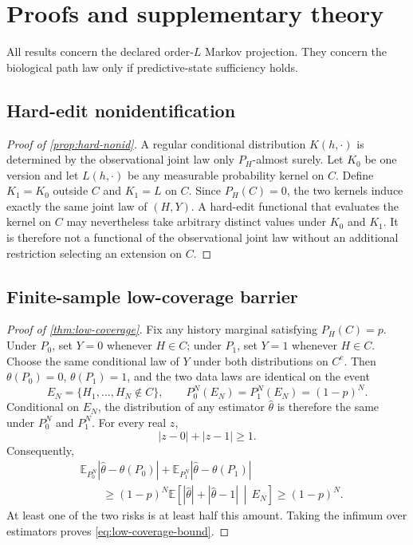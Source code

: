 \documentclass{article}
\newcommand{\E}{\mathbb E}
\theoremstyle{remark}
\begin{document}
\appendix

\section{Proofs and supplementary theory}
\label{app:proofs}

All results concern the declared order-\(L\) Markov projection. They concern
the biological path law only if predictive-state sufficiency holds.

\subsection{Hard-edit nonidentification}

\begin{proof}[Proof of \cref{prop:hard-nonid}]
A regular conditional distribution \(K(h,\cdot)\) is determined by the
observational joint law only \(P_H\)-almost surely. Let \(K_0\) be one version
and let \(L(h,\cdot)\) be any measurable probability kernel on \(C\). Define
\(K_1=K_0\) outside \(C\) and \(K_1=L\) on \(C\). Since \(P_H(C)=0\), the two
kernels induce exactly the same joint law of \((H,Y)\). A hard-edit functional
that evaluates the kernel on \(C\) may nevertheless take arbitrary distinct
values under \(K_0\) and \(K_1\). It is therefore not a functional of the
observational joint law without an additional restriction selecting an
extension on \(C\).
\end{proof}

\subsection{Finite-sample low-coverage barrier}

\begin{proof}[Proof of \cref{thm:low-coverage}]
Fix any history marginal satisfying \(P_H(C)=p\). Under \(P_0\), set
\(Y=0\) whenever \(H\in C\); under \(P_1\), set \(Y=1\) whenever \(H\in C\).
Choose the same conditional law of \(Y\) under both distributions on
\(C^c\). Then \(\theta(P_0)=0\), \(\theta(P_1)=1\), and the two data laws are
identical on the event
\[
  E_N=\{H_1,\ldots,H_N\notin C\},
  \qquad
  P_0^N(E_N)=P_1^N(E_N)=(1-p)^N.
\]
Conditional on \(E_N\), the distribution of any estimator
\(\widehat\theta\) is therefore the same under \(P_0^N\) and \(P_1^N\).
For every real \(z\),
\[
  |z-0|+|z-1|\geq1.
\]
Consequently,
\[
\begin{split}
  &\E_{P_0^N}|\widehat\theta-\theta(P_0)|
  +\E_{P_1^N}|\widehat\theta-\theta(P_1)|\\
  &\qquad\geq
  (1-p)^N
  \E\!\left[
    |\widehat\theta|+|\widehat\theta-1|
    \,\middle|\,E_N
  \right]
  \geq(1-p)^N.
\end{split}
\]
At least one of the two risks is at least half this amount. Taking the infimum
over estimators proves \cref{eq:low-coverage-bound}.
\end{proof}
\end{document}

